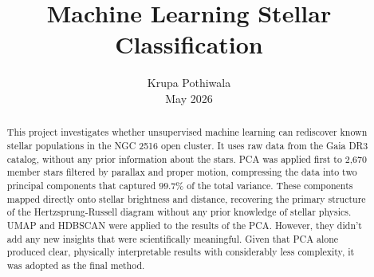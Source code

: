 \documentclass[12pt]{article}
\title{Machine Learning Stellar Classification}
\author{Krupa Pothiwala \\[0.5em]
May 2026}
\date{}
\begin{document}
\maketitle

\begin{abstract}
This project investigates whether unsupervised machine learning can rediscover known stellar populations in the NGC 2516 open cluster. It uses raw data from the Gaia DR3 catalog, without any prior information about the stars. PCA was applied first to 2,670 member stars filtered by parallax and proper motion, compressing the data into two principal components that captured $99.7\%$ of the total variance. These components mapped directly onto stellar brightness and distance, recovering the primary structure of the Hertzsprung-Russell diagram without any prior knowledge of stellar physics. UMAP and HDBSCAN were applied to the results of the PCA. However, they didn't add any new insights that were scientifically meaningful. Given that PCA alone produced clear, physically interpretable results with considerably less complexity, it was adopted as the final method.
\end{abstract}
\newpage
\end{document}
